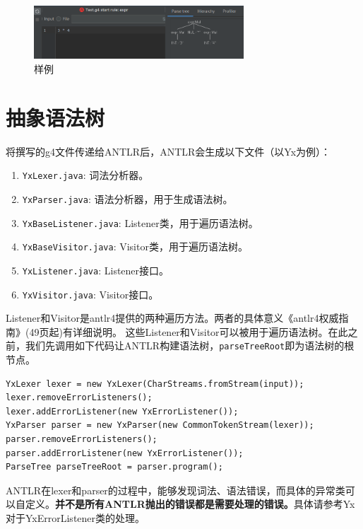 \begin{figure}[htbp]
    \centering
    \includegraphics[width=0.7\textwidth]{image/g4.png}
    \caption{样例}
\end{figure}




\section{抽象语法树}

将撰写的g4文件传递给ANTLR后，ANTLR会生成以下文件（以Yx为例）：
\begin{enumerate}
    \item \texttt{YxLexer.java}: 词法分析器。
    \item \texttt{YxParser.java}: 语法分析器，用于生成语法树。
    \item \texttt{YxBaseListener.java}: Listener类，用于遍历语法树。
    \item \texttt{YxBaseVisitor.java}: Visitor类，用于遍历语法树。
    \item \texttt{YxListener.java}: Listener接口。
    \item \texttt{YxVisitor.java}: Visitor接口。
\end{enumerate}
Listener和Visitor是antlr4提供的两种遍历方法。两者的具体意义《antlr4权威指南》(49页起)有详细说明。
这些Listener和Visitor可以被用于遍历语法树。在此之前，我们先调用如下代码让ANTLR构建语法树，\texttt{parseTreeRoot}即为语法树的根节点。
\begin{lstlisting}
YxLexer lexer = new YxLexer(CharStreams.fromStream(input));
lexer.removeErrorListeners();
lexer.addErrorListener(new YxErrorListener());
YxParser parser = new YxParser(new CommonTokenStream(lexer));
parser.removeErrorListeners();
parser.addErrorListener(new YxErrorListener());
ParseTree parseTreeRoot = parser.program();
\end{lstlisting}

\begin{remark}
    ANTLR在lexer和parser的过程中，能够发现词法、语法错误，而具体的异常类可以自定义。\textbf{并不是所有ANTLR抛出的错误都是需要处理的错误。}具体请参考Yx对于YxErrorListener类的处理。
\end{remark}

